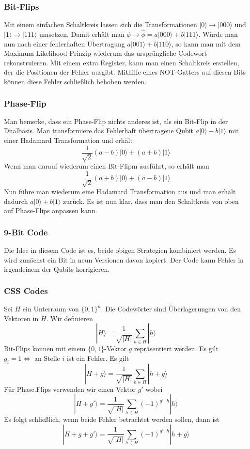 \documentclass[a4paper, 12pt]{article}
\theoremstyle{plain}
\theoremstyle{definition}
\theoremstyle{lemma}
\theoremstyle{remark}
\theoremstyle{example}
\begin{document}
	\subsubsection{Bit-Flips}
	Mit einem einfachen Schaltkreis lassen sich die Transformationen $|0\rangle \to |000\rangle$ und $|1\rangle \to |111\rangle$ umsetzen. Damit erhält man $\phi \to \hat{\phi} = a|000\rangle + b|111\rangle$. Würde man nun nach einer fehlerhaften Übertragung $a|001\rangle + b|110\rangle$, so kann man mit dem Maximum-Likelihood-Prinzip wiederum das ursprüngliche Codewort rekonstruieren. Mit einem extra Register, kann man einen Schaltkreis erstellen, der die Positionen der Fehler ausgibt. Mithilfe eines NOT-Gatters auf diesen Bits können diese Fehler schließlich behoben werden.
	\subsubsection{Phase-Flip}
	Man bemerke, dass ein Phase-Flip nichts anderes ist, als ein Bit-Flip in der Dualbasis. Man transformiere das Fehlerhaft übertragene Qubit $a|0\rangle - b|1\rangle$ mit einer Hadamard Transformation und erhält \[\frac{1}{\sqrt{2}} (a-b)|0\rangle + (a+b)|1\rangle\] Wenn man darauf wiederum einen Bit-Flipm ausführt, so erhält man \[\frac{1}{\sqrt{2}} (a+b)|0\rangle + (a-b)|1\rangle\] Nun führe man wiederum eine Hadamard Transformation aus und man erhält dadurch $a|0\rangle + b|1\rangle$ zurück. Es ist nun klar, dass man den Schaltkreis von oben auf Phase-Flips anpassen kann.
	\subsubsection{9-Bit Code}
	Die Idee in diesem Code ist es, beide obigen Strategien kombiniert werden. Es wird zunächst ein Bit in neun Versionen davon kopiert. Der Code kann Fehler in irgendeinem der Qubits korrigieren. 
	\subsubsection{CSS Codes}
	Sei $H$ ein Unterraum von $\{0,1\}^n$. Die Codewörter sind Überlagerungen von den Vektoren in $H$. Wir definieren \[|H\rangle = \frac{1}{\sqrt{\left|H\right|}} \sum_{h \in H} |h\rangle\] Bit-Flips können mit einem $\{0,1\}$-Vektor $g$ repräsentiert werden. Es gilt $g_i = 1 \iff$ an Stelle $i$ ist ein Fehler. Es gilt \[|H+g\rangle = \frac{1}{\sqrt{\left|H\right|}} \sum_{h \in H} |h+g\rangle\] Für Phase.Flips verwenden wir einen Vektor $g'$ wobei \[|H+g'\rangle = \frac{1}{\sqrt{\left|H\right|}}\sum_{h \in H} (-1)^{g'\cdot h} |h\rangle\]
	Es folgt schließlich, wenn beide Fehler betrachtet werden sollen, dann ist \[|H+g+g'\rangle = \frac{1}{\sqrt{\left|H\right|}} \sum_{h \in H} (-1)^{g'\cdot h}|h+g\rangle\]
\end{document}
